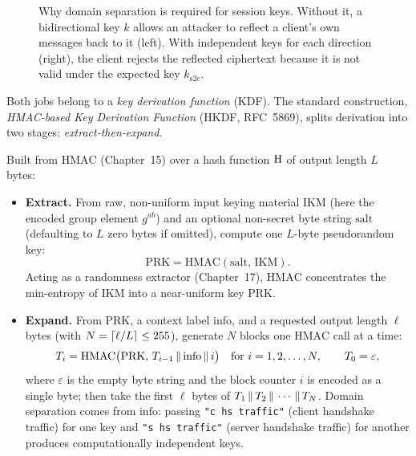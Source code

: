 \begin{figure}[htbp]
\caption{Why domain separation is required for session keys. Without it, a bidirectional key $k$ allows an attacker to reflect a client's own messages back to it (left). With independent keys for each direction (right), the client rejects the reflected ciphertext because it is not valid under the expected key $k_{\mathrm{s2c}}$.}
\label{ch23:fig-domain-separation}
\end{figure}

Both jobs belong to a \emph{key derivation function} (KDF). The standard
construction, \emph{HMAC-based Key Derivation Function} (HKDF, RFC~5869), splits
derivation into two stages: \emph{extract-then-expand}.

\begin{definition}
\label{ch23:hkdf}
Built from $\mathrm{HMAC}$ (Chapter~15) over a hash function $\operatorname{H}$ of output
length $L$ bytes:
\begin{itemize}
  \item \textbf{Extract.} From raw, non-uniform input keying material
        $\mathrm{IKM}$ (here the encoded group element $g^{ab}$) and an optional
        non-secret byte string $\mathrm{salt}$ (defaulting to $L$ zero bytes if
        omitted), compute one $L$-byte pseudorandom key:
        \[
          \mathrm{PRK} = \mathrm{HMAC}(\mathrm{salt},\, \mathrm{IKM}).
        \]
        Acting as a randomness extractor (Chapter~17), $\mathrm{HMAC}$
        concentrates the min-entropy of $\mathrm{IKM}$ into a near-uniform key
        $\mathrm{PRK}$.
  \item \textbf{Expand.} From $\mathrm{PRK}$, a context label $\mathrm{info}$,
        and a requested output length $\ell$ bytes (with $N = \lceil\ell/L\rceil \le
        255$), generate $N$ blocks one $\mathrm{HMAC}$ call at a time:
        \[
          T_i = \mathrm{HMAC}\bigl(\mathrm{PRK},\, T_{i-1}\,\|\, \mathrm{info}\,\|\, i\bigr)
          \quad \text{for } i = 1, 2, \dots, N, \qquad T_0 = \varepsilon,
        \]
        where $\varepsilon$ is the empty byte string and the block counter $i$
        is encoded as a single byte; then take the first $\ell$ bytes of
        $T_1\,\|\, T_2\,\|\,\cdots\,\|\, T_N$. Domain separation comes from
        $\mathrm{info}$: passing \texttt{"c hs traffic"} (client handshake
        traffic) for one key and \texttt{"s hs traffic"} (server handshake
        traffic) for another produces computationally independent keys.
\end{itemize}
\end{definition}

